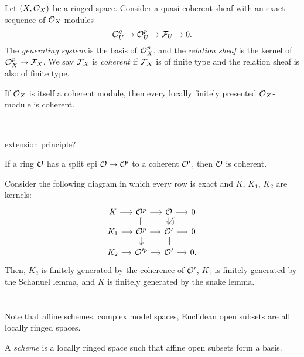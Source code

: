 \documentclass{../../large}
\begin{document}
\begin{prb}
Let $(X,\mathcal{O}_X)$ be a ringed space.
Consider a quasi-coherent sheaf with an exact sequence of $\mathcal{O}_X$-modules
\[\mathcal{O}_U^q\to\mathcal{O}_U^p\to\mathcal{F}_U\to0.\]
The \emph{generating system} is the basis of $\mathcal{O}_X^p$, and the \emph{relation sheaf} is the kernel of $\mathcal{O}_X^p\to\mathcal{F}_X$.
We say $\mathcal{F}_X$ is \emph{coherent} if $\mathcal{F}_X$ is of finite type and the relation sheaf is also of finite type.
\begin{parts}
\item If $\mathcal{O}_X$ is itself a coherent module, then every locally finitely presented $\mathcal{O}_X$-module is coherent.
\end{parts}
\end{prb}



\begin{prb}\,
\begin{parts}
\item extension principle?
\item If a ring $\mathcal{O}$ has a split epi $\mathcal{O}\to\mathcal{O}'$ to a coherent $\mathcal{O}'$, then $\mathcal{O}$ is coherent.
\end{parts}
\end{prb}
\begin{pf}
Consider the following diagram in which every row is exact and $K$, $K_1$, $K_2$ are kernels:
\[\begin{tikzcd}[sep=small]
K \rar & \cO^p \rar\dar[equals] & \cO \rar\dar[two heads] & 0\\
K_1 \rar & \cO^p \rar\dar[two heads] & \cO' \rar\dar[equals]\uar[hookrightarrow,bend right] & 0\\
K_2 \rar & \cO'^p \rar & \cO' \rar & 0.
\end{tikzcd}\]
Then, $K_2$ is finitely generated by the coherence of $\mathcal{O}'$, $K_1$ is finitely generated by the Schanuel lemma, and $K$ is finitely generated by the snake lemma.
\end{pf}




\section{}

Note that affine schemes, complex model spaces, Euclidean open subsets are all locally ringed spaces.


A \emph{scheme} is a locally ringed space such that affine open subsets form a basis.
\end{document}
